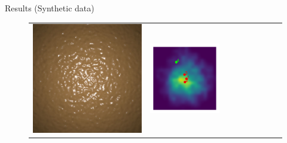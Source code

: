 \documentclass[final]{beamer}
\newlength{\twocolwid}
\newlength{\resultwidth}
\begin{document}
\begin{frame}[t]
\begin{columns}[t]
\begin{column}{\twocolwid}
\begin{block}{Results (Synthetic data)}
\begin{figure}[t]
\begin{tabular}{ccrclcccc}
            		\includegraphics[width=\resultwidth]{synth/bump/optim.jpg} &
            		\includegraphics[width=\resultwidth]{synth/bump/posterior.pdf} &

\end{tabular}
\end{figure}
\end{block}
\end{column}
\end{columns}
\end{frame}
\end{document}
